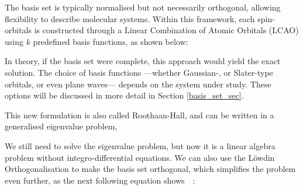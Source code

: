 The basis set is typically normalised but not necessarily orthogonal,
allowing flexibility to describe molecular systems. Within this framework,
each spin-orbitals is constructed through a Linear Combination of Atomic Orbitals
(\gls{LCAO}) using $k$ predefined basis functions, as shown below:


\newpage
In theory, if the basis set were complete, this approach would yield the exact
solution. The choice of basis functions ---whether Gaussian-, or Slater-type
orbitals, or even plane waves--- depends on the system under study. These options
will be discussed in more detail in Section \ref{basis_set_sec}.

This new formulation is also called Roothaan-Hall, and can be
written in a generalised eigenvalue problem, 


We still need to solve the eigenvalue problem, but now it is a linear algebra
problem without integro-differential equations. We can also use the
Löwdin Orthogonalisation to make the basis set orthogonal, which simplifies the
problem even further, as the next following equation shows~\cite{Mayer2003}~:

{}

